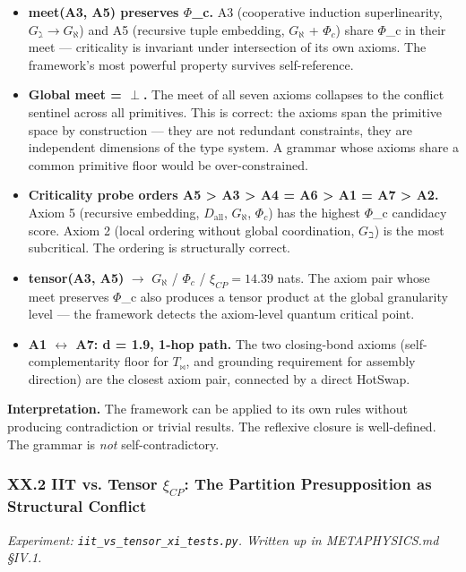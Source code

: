 \documentclass[12pt,a4paper]{article}
\begin{document}
\begin{itemize}
    \item \textbf{meet(A3, A5) preserves $\Phi$\_c.} A3 (cooperative induction superlinearity, $G_{\gimel} \to G_{\aleph}$) and A5 (recursive tuple embedding, $G_{\aleph}$ + $\Phi_c$) share $\Phi$\_c in their meet --- criticality is invariant under intersection of its own axioms. The framework's most powerful property survives self-reference.
    \item \textbf{Global meet = $\perp$.} The meet of all seven axioms collapses to the conflict sentinel across all primitives. This is correct: the axioms span the primitive space by construction --- they are not redundant constraints, they are independent dimensions of the type system. A grammar whose axioms share a common primitive floor would be over-constrained.
    \item \textbf{Criticality probe orders A5 \textgreater{} A3 \textgreater{} A4 = A6 \textgreater{} A1 = A7 \textgreater{} A2.} Axiom 5 (recursive embedding, $D_{\text{all}}$, $G_{\aleph}$, $\Phi_c$) has the highest $\Phi$\_c candidacy score. Axiom 2 (local ordering without global coordination, $G_{\beth}$) is the most subcritical. The ordering is structurally correct.
    \item \textbf{tensor(A3, A5)} $\rightarrow$ $G_{\aleph}$ / $\Phi_c$ / $\xi_{CP} = 14.39$ nats. The axiom pair whose meet preserves $\Phi$\_c also produces a tensor product at the global granularity level --- the framework detects the axiom-level quantum critical point.
    \item \textbf{A1 $\leftrightarrow$ A7: d = 1.9, 1-hop path.} The two closing-bond axioms (self-complementarity floor for $T_{\bowtie}$, and grounding requirement for assembly direction) are the closest axiom pair, connected by a direct HotSwap.
\end{itemize}

\textbf{Interpretation.} The framework can be applied to its own rules without producing contradiction or trivial results. The reflexive closure is well-defined. The grammar is \emph{not} self-contradictory.

\subsubsection{XX.2 IIT vs. Tensor $\xi_{CP}$: The Partition Presupposition as Structural Conflict}

\emph{Experiment: \texttt{iit\_vs\_tensor\_xi\_tests.py}. Written up in METAPHYSICS.md §IV.1.}
\end{document}
